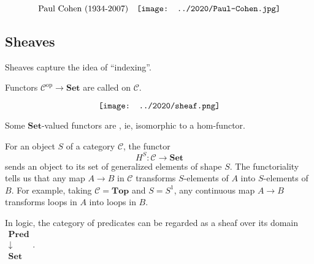 \begin{equation}
\mbox{Paul Cohen (1934-2007)} \quad \vcenter{\hbox{\texttt{[image: ../2020/Paul-Cohen.jpg]}}}
\nonumber
\end{equation}

\subsection{Sheaves}

Sheaves capture the idea of ``indexing''.

Functors $\mathcal{C}^{\mathrm{op}} \rightarrow \mathbf{Set}$ are called  on $\mathcal{C}$.


\begin{equation}
\vcenter{\hbox{\texttt{[image: ../2020/sheaf.png]}}}
\end{equation}

Some $\mathbf{Set}$-valued functors are , ie, isomorphic to a hom-functor.

For an object $S$ of a category $\mathcal{C}$, the functor
\begin{equation}
H^S : \mathcal{C} \rightarrow \mathbf{Set}
\end{equation}
sends an object to its set of generalized elements of shape $S$.  The functoriality tells us that any map $A \rightarrow B$ in $\mathcal{C}$ transforms $S$-elements of $A$ into $S$-elements of $B$.  For example, taking $\mathcal{C} = \mathbf{Top}$ and $S = S^1$, any continuous map $A \rightarrow B$ transforms loops in $A$ into loops in $B$.

In logic, the category of predicates can be regarded as a sheaf over its domain $\mathrel{\substack{\mathbf{Pred}\\\downarrow\\\mathbf{Set}}}$.


